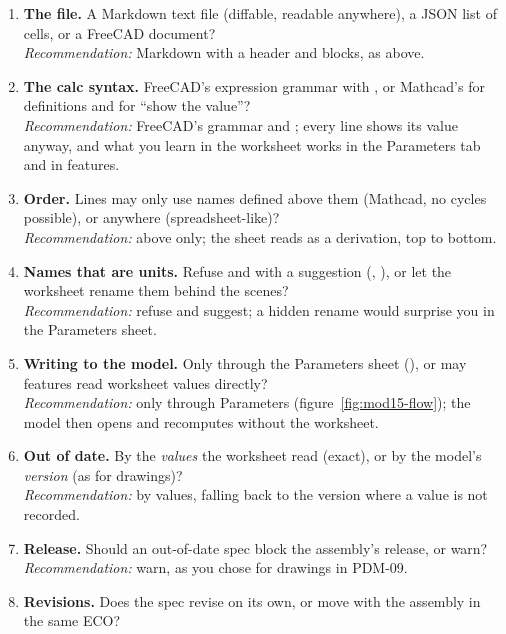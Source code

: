 \begin{enumerate}
  \item \textbf{The file.} A Markdown text file  (diffable, readable anywhere), a JSON list of
        cells, or a FreeCAD document?\\
        \emph{Recommendation:} Markdown with a header and  blocks, as above.
  \item \textbf{The calc syntax.} FreeCAD's expression grammar with , or Mathcad's \code{:=} for
        definitions and \code{=} for ``show the value''?\\
        \emph{Recommendation:} FreeCAD's grammar and \code{=}; every line shows its value anyway, and what you learn in
        the worksheet works in the Parameters tab and in features.
  \item \textbf{Order.} Lines may only use names defined above them (Mathcad, no cycles possible), or anywhere
        (spreadsheet-like)?\\
        \emph{Recommendation:} above only; the sheet reads as a derivation, top to bottom.
  \item \textbf{Names that are units.} Refuse  and  with a suggestion (, ), or
        let the worksheet rename them behind the scenes?\\
        \emph{Recommendation:} refuse and suggest; a hidden rename would surprise you in the Parameters sheet.
  \item \textbf{Writing to the model.} Only through the Parameters sheet (), or may features read
        worksheet values directly?\\
        \emph{Recommendation:} only through Parameters (figure~\ref{fig:mod15-flow}); the model then opens and
        recomputes without the worksheet.
  \item \textbf{Out of date.} By the \emph{values} the worksheet read (exact), or by the model's \emph{version} (as for
        drawings)?\\
        \emph{Recommendation:} by values, falling back to the version where a value is not recorded.
  \item \textbf{Release.} Should an out-of-date spec block the assembly's release, or warn?\\
        \emph{Recommendation:} warn, as you chose for drawings in PDM-09.
  \item \textbf{Revisions.} Does the spec revise on its own, or move with the assembly in the same ECO?\\

\end{enumerate}
